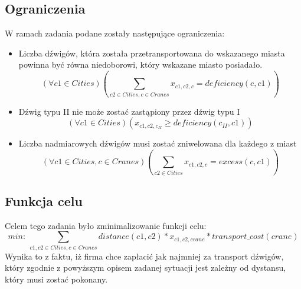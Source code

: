 \documentclass[a4paper,14pt]{report}
\begin{document}
    \subsection{Ograniczenia}
        W ramach zadania podane zostały następujące ograniczenia:
        \begin{itemize}
            \item Liczba dźwigów, która została przetransportowana do wskazanego miasta 
            powinna być równa niedoborowi, który wskazane miasto posiadało.
            \begin{equation}
                ( \forall c1 \in Cities) (\sum_{c2 \in Cities, c \in Cranes} x_{c1,c2,c} = deficiency(c,c1))
            \end{equation}
            \item Dźwig typu II nie może zostać zastąpiony przez dźwig typu I
            \begin{equation}
                ( \forall c1 \in Cities) ( x_{c1,c2,c_{II}} \geq deficiency(c_{II},c1))
            \end{equation}
            \item Liczba nadmiarowych dźwigów musi zostać zniwelowana dla każdego z miast
            \begin{equation}
                ( \forall c1 \in Cities, c \in Cranes) (\sum_{c2 \in Cities} x_{c1,c2,c} = excess(c,c1))
            \end{equation}
        \end{itemize}
    \subsection{Funkcja celu}
        Celem tego zadania było zminimalizowanie funkcji celu:
        \begin{equation}
         min :\ \sum_{c1,c2 \in Cities, c \in Cranes} distance(c1,c2) * x_{c1,c2,crane}  * transport\_cost(crane) 
        \end{equation}
        Wynika to z faktu, iż firma chce zapłacić jak najmniej za transport dźwigów, który zgodnie z powyższym opisem zadanej sytuacji jest zależny od dystansu, 
        który musi zostać pokonany.
\end{document}
